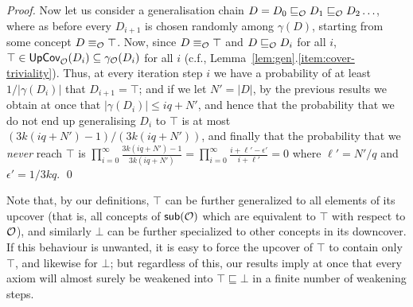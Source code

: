 \documentclass[
]{ceurart}
\begin{document}
\begin{proof}
Now let us consider a generalisation chain $D = D_0 \sqsubseteq_\mathcal{O} D_1 \sqsubseteq_\mathcal{O} D_2 \ldots$, where as before every $D_{i+1}$ is chosen randomly among $\gamma(D)$, starting from some concept $D \equiv_\mathcal{O} \top$. Now, since $D \equiv_\mathcal{O} \top$ and $D \sqsubseteq_\mathcal{O} D_i$ for all $i$, $\top \in \textsf{UpCov}_\mathcal{O}(D_i) \subseteq \gamma_\mathcal{O}(D_i)$ for all $i$ (c.f., Lemma~\ref{lem:gen}.\ref{item:cover-triviality}). Thus, at every iteration step $i$ we have a probability of at least $1/|\gamma(D_i)|$ that $D_{i+1} = \top$; and if we let $N' = |D|$, by the previous results we obtain at once that $|\gamma(D_i)| \leq iq + N'$, and hence that the probability that we do not end up generalising $D_i$ to $\top$ is at most $(3k(iq + N') - 1)/(3k(iq+N'))$, and finally that the probability that we \emph{never} reach $\top$ is $\prod_{i=0}^\infty \frac{3k (iq + N') - 1}{3k(iq + N')} = \prod_{i = 0}^\infty \frac{i + \ell' - \epsilon'}{i + \ell'} = 0$ where $\ell' = N'/q$ and $\epsilon' = 1/3kq$. 
\qed\end{proof}

Note that, by our definitions, $\top$ can be further generalized to all elements of its upcover (that is, all concepts of $\mathop{\mathsf{sub}}(\mathcal{O})$ which are equivalent to $\top$ with respect to $\mathcal{O}$), and similarly $\bot$ can be further specialized to other concepts in its downcover. If this behaviour is unwanted, it is easy to force the upcover of $\top$ to contain only $\top$, and likewise for $\bot$; but regardless of this, our results imply at once that every axiom will almost surely be weakened into $\top \sqsubseteq \bot$ in a finite number of weakening steps. 
\end{document}
